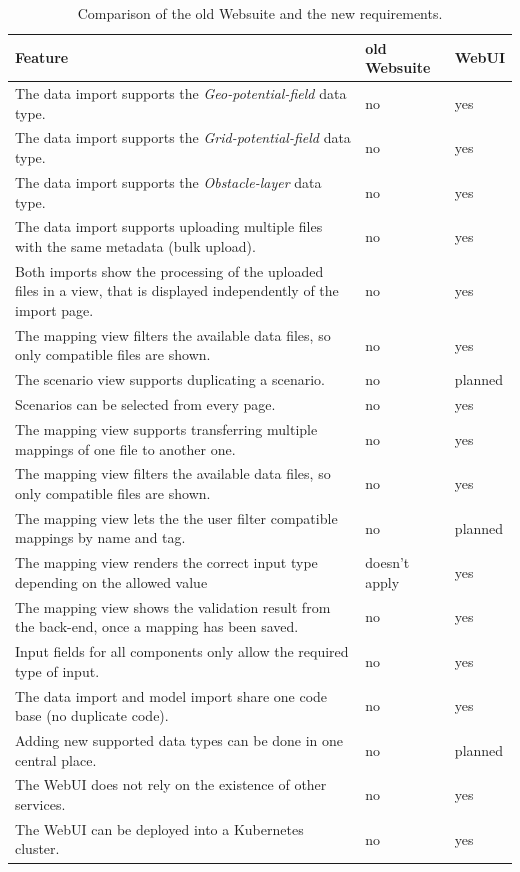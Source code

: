 \begin{table}[H]
	\caption{Comparison of the old Websuite and the new requirements.}
	\begin{tabularx}{\textwidth}{|X|l|l|}
	\hline
	\textbf{Feature} & \textbf{old Websuite} & \textbf{WebUI} \\ \hline
	The data import supports the \textit{Geo-potential-field} data type. & no & yes \\ \hline
	The data import supports the \textit{Grid-potential-field} data type. & no & yes \\ \hline
	The data import supports the \textit{Obstacle-layer} data type. & no & yes \\ \hline
	The data import supports uploading multiple files with the same metadata (bulk upload). & no & yes \\ \hline
	Both imports show the processing of the uploaded files in a view, that is displayed independently of the import page. & no & yes \\ \hline
	The mapping view filters the available data files, so only compatible files are shown. & no & yes \\ \hline
	The scenario view supports duplicating a scenario. & no & planned \\ \hline
	Scenarios can be selected from every page. & no & yes \\ \hline
	The mapping view supports transferring multiple mappings of one file to another one. & no & yes \\ \hline
	The mapping view filters the available data files, so only compatible files are shown. & no & yes \\ \hline
	The mapping view lets the the user filter compatible mappings by name and tag. & no & planned \\ \hline
	The mapping view renders the correct input type depending on the allowed value & doesn't apply & yes \\ \hline
	The mapping view shows the validation result from the back-end, once a mapping has been saved. & no & yes \\ \hline
	Input fields for all components only allow the required type of input. & no & yes \\ \hline
	The data import and model import share one code base (no duplicate code). & no & yes \\ \hline
	Adding new supported data types can be done in one central place. & no & planned \\ \hline
	The WebUI does not rely on the existence of other services. & no & yes \\ \hline
	The WebUI can be deployed into a Kubernetes cluster. & no & yes \\ \hline
	\end{tabularx}
\end{table}

